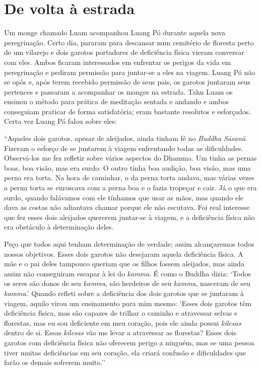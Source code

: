 \thistitleoffsettrue
\chapter{De volta à estrada}

Um monge chamado Luam acompanhou Luang Pó durante aquela nova
peregrinação. Certo dia, pararam para descansar num cemitério de
floresta perto de um vilarejo e dois garotos portadores de deficiência
física vieram conversar com eles. Ambos ficaram interessados em
enfrentar os perigos da vida em peregrinação e pediram permissão para
juntar-se a eles na viagem. Luang Pó não se opôs e, após terem recebido
permissão de seus pais, os garotos juntaram seus pertences e passaram a
acompanhar os monges na estrada. Tahn Luam os ensinou o método para
prática de meditação sentada e andando e ambos conseguiam praticar de
forma satisfatória; eram bastante resolutos e esforçados. Certa vez
Luang Pó falou sobre eles:

``Aqueles dois garotos, apesar de aleijados, ainda tinham fé no
\emph{Buddha Sāsanā}. Fizeram o esforço de se juntarem à viagem
enfrentando todas as dificuldades. Observá-los me fez refletir sobre
vários aspectos do Dhamma. Um tinha as pernas boas, boa visão, mas era
surdo. O outro tinha boa audição, boa visão, mas uma perna era torta. Na
hora de caminhar, o da perna torta andava, mas várias vezes a perna
torta se enroscava com a perna boa e o fazia tropeçar e cair. Já o que
era surdo, quando falávamos com ele tínhamos que usar as mãos, mas
quando ele dava as costas não adiantava chamar porque ele não escutava.
Foi real interesse que fez esses dois aleijados quererem juntar-se à
viagem, e a deficiência física não era obstáculo à determinação deles.

Peço que todos aqui tenham determinação de verdade; assim alcançaremos
todos nossos objetivos. Esses dois garotos não desejaram aquela
deficiência física. A mãe e o pai deles tampouco queriam que os filhos
fossem aleijados, mas ainda assim não conseguiram escapar à lei do
\emph{kamma}. É como o Buddha dizia: `Todos os seres são donos de seu
\emph{kamma}, são herdeiros de seu \emph{kamma}, nasceram de seu
\emph{kamma}.' Quando refleti sobre a deficiência dos dois garotos que
se juntaram à viagem, aquilo virou um ensinamento para mim mesmo: `Esses
dois garotos têm deficiência física, mas são capazes de trilhar o
caminho e atravessar selvas e florestas, mas eu sou deficiente em meu
coração, pois ele ainda possui \emph{kilesas} dentro de si. Essas
\emph{kilesas} vão me levar a atravessar as florestas? Esses dois
garotos com deficiência física não oferecem perigo a ninguém, mas se uma
pessoa tiver muitas deficiências em seu coração, ela criará confusão e
dificuldades que farão os demais sofrerem muito.''


